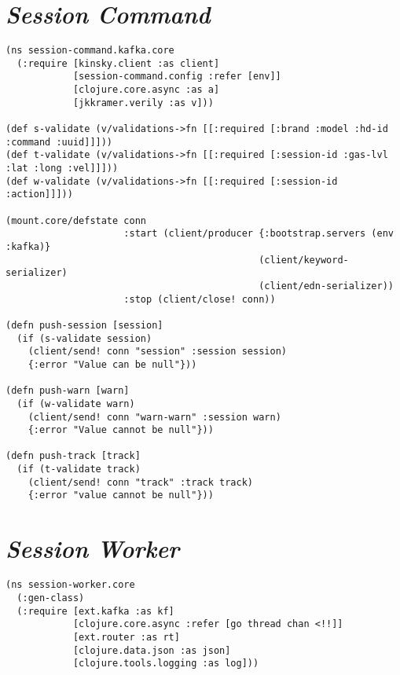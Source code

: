 \begin{apendicesenv}


\lstset{frame=none}
\chapter{\textit{Session Command}}
\label{ap:sessioncommand}

\begin{lstlisting}
(ns session-command.kafka.core
  (:require [kinsky.client :as client]
            [session-command.config :refer [env]]
            [clojure.core.async :as a]
            [jkkramer.verily :as v]))

(def s-validate (v/validations->fn [[:required [:brand :model :hd-id :command :uuid]]]))
(def t-validate (v/validations->fn [[:required [:session-id :gas-lvl :lat :long :vel]]]))
(def w-validate (v/validations->fn [[:required [:session-id :action]]]))

(mount.core/defstate conn
                     :start (client/producer {:bootstrap.servers (env :kafka)}
                                             (client/keyword-serializer)
                                             (client/edn-serializer))
                     :stop (client/close! conn))

(defn push-session [session]
  (if (s-validate session)
    (client/send! conn "session" :session session)
    {:error "Value can be null"}))

(defn push-warn [warn]
  (if (w-validate warn)
    (client/send! conn "warn-warn" :session warn)
    {:error "Value cannot be null"}))

(defn push-track [track]
  (if (t-validate track)
    (client/send! conn "track" :track track)
    {:error "value cannot be null"}))
\end{lstlisting}

\chapter{\textit{Session Worker}}
\label{ap:sessionworker}
\begin{lstlisting}
(ns session-worker.core
  (:gen-class)
  (:require [ext.kafka :as kf]
            [clojure.core.async :refer [go thread chan <!!]]
            [ext.router :as rt]
            [clojure.data.json :as json]
            [clojure.tools.logging :as log]))


\end{lstlisting}
\end{apendicesenv}
